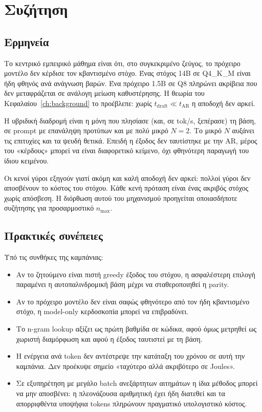 \documentclass[a4paper,12pt]{report}
\theoremstyle{plain}
\theoremstyle{definition}
\theoremstyle{remark}
\begin{document}
\chapter{Συζήτηση}
\label{ch:discussion}

\section{Ερμηνεία}

Το κεντρικό εμπειρικό μάθημα είναι ότι, στο συγκεκριμένο ζεύγος, το πρόχειρο
μοντέλο δεν κέρδισε τον κβαντισμένο στόχο. Ένας στόχος 14B σε Q4\_K\_M είναι
ήδη φθηνός ανά ανάγνωση βαρών. Ένα πρόχειρο 1.5B σε Q8 πληρώνει ακρίβεια που
δεν μεταφράζεται σε ανάλογη μείωση καθυστέρησης. Η θεωρία του
Κεφαλαίου~\ref{ch:background} το προέβλεπε: χωρίς
\(t_{\mathrm{draft}}\ll t_{\mathrm{AR}}\) η αποδοχή δεν αρκεί.

Η υβριδική διαδρομή είναι η μόνη που πλησίασε (και, σε tok/s, ξεπέρασε) τη
βάση, σε prompt με επανάληψη προτύπων και με πολύ μικρό \(N=2\). Το μικρό
\(N\) αυξάνει τις επιτυχίες και τα ψευδή θετικά. Επειδή η έξοδος δεν ταυτίστηκε
με την AR, μέρος του «κέρδους» μπορεί να είναι διαφορετικό κείμενο, όχι
φθηνότερη παραγωγή του ίδιου κειμένου.

Οι κενοί γύροι εξηγούν γιατί ακόμη και καλή αποδοχή δεν αρκεί: πολλοί γύροι δεν
αποσβένουν το κόστος του στόχου.
Κάθε κενή πρόταση είναι ένας ακριβός στόχος χωρίς απόσβεση. Η διόρθωση αυτού
του μηχανισμού προηγείται οποιασδήποτε συζήτησης για προσαρμοστικό
\(n_{\max}\).

\section{Πρακτικές συνέπειες}

Υπό τις συνθήκες της καμπάνιας:

\begin{itemize}[leftmargin=*]
  \item Αν το ζητούμενο είναι πιστή greedy έξοδος του στόχου, η ασφαλέστερη
    επιλογή παραμένει η αυτοπαλινδρομική βάση μέχρι να σταθεροποιηθεί η parity.
  \item Αν το πρόχειρο μοντέλο δεν είναι σαφώς φθηνότερο από τον ήδη
    κβαντισμένο στόχο, η model-only κερδοσκοπία μπορεί να επιβραδύνει.
  \item Το n-gram lookup αξίζει ως πρώτη βαθμίδα σε κώδικα, αφού όμως μετρηθεί
    ως χωριστή διαμόρφωση και αφού η έξοδος ταυτιστεί με τη βάση.
  \item Η ενέργεια ανά token δεν αντέστρεψε την κατάταξη του χρόνου σε αυτή την
    καμπάνια. Δεν προέκυψε σημείο «ταχύτερο αλλά ακριβότερο σε Joules».
  \item Σε εξυπηρέτηση με μεγάλο batch ανεξάρτητων αιτημάτων η ίδια μέθοδος
    μπορεί να μην αποσβένει: η πλεονάζουσα αριθμητική έχει ήδη διατεθεί και
    τα απορριφθέντα υποψήφια tokens πληρώνουν πραγματικό υπολογιστικό κόστος.
\end{itemize}
\end{document}
